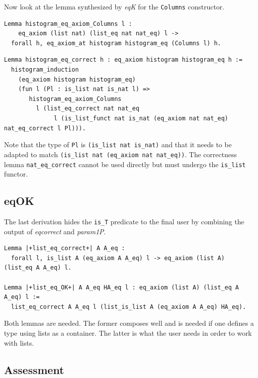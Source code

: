\documentclass[a4paper,UKenglish,cleveref, autoref]{lipics-v2019}
\newcommand{\derive}[1]{\emph{#1}}
\begin{document}
Now look at the lemma synthesized by \derive{eqK}
for the \lstinline+Columns+ constructor.

\begin{lstlisting}
Lemma histogram_eq_axiom_Columns l :
    eq_axiom (list nat) (list_eq nat nat_eq) l ->
  forall h, eq_axiom_at histogram histogram_eq (Columns l) h.
\end{lstlisting}

\begin{lstlisting}
Lemma histogram_eq_correct h : eq_axiom histogram histogram_eq h :=
  histogram_induction 
    (eq_axiom histogram histogram_eq)
    (fun l (Pl : is_list nat is_nat l) =>
       histogram_eq_axiom_Columns
         l (list_eq_correct nat nat_eq
              l (is_list_funct nat is_nat (eq_axiom nat nat_eq) nat_eq_correct l Pl))).
\end{lstlisting}

\noindent
Note that the type of \lstinline+Pl+ is
\lstinline+(is_list nat is_nat)+ and that it
needs to be adapted to match
\lstinline+(is_list nat (eq_axiom nat nat_eq))+.
The correctness lemma \lstinline+nat_eq_correct+ cannot be used directly
but must undergo the \lstinline+is_list+ functor.

\subsection{eqOK} %

The last derivation hides the \lstinline+is_T+ predicate
to the final user by combining the output of
\derive{eqcorrect} and \derive{param1P}.

\begin{lstlisting}
Lemma |+list_eq_correct+| A A_eq :
  forall l, is_list A (eq_axiom A A_eq) l -> eq_axiom (list A) (list_eq A A_eq) l.

Lemma |+list_eq_OK+| A A_eq HA_eq l : eq_axiom (list A) (list_eq A A_eq) l :=
  list_eq_correct A A_eq l (list_is_list A (eq_axiom A A_eq) HA_eq).
\end{lstlisting}

\noindent
Both lemmas are needed. The former composes well
and is needed if one defines a type using lists as a container.
The latter is what the user needs in order to work with lists.

\subsection{Assessment} %
\end{document}
